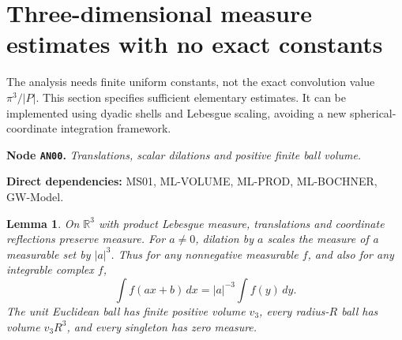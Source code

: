 \documentclass[11pt,a4paper]{article}
\newtheorem{lemma}[theorem]{Lemma}
\theoremstyle{remark}\newtheorem{remark}[theorem]{Remark}
\newcommand{\R}{\mathbb R}\newcommand{\C}{\mathbb C}\newcommand{\N}{\mathbb N}
\newcommand{\abs}[1]{\lvert #1\rvert}\newcommand{\rankone}[2]{\lvert #1\rangle\langle #2\rvert}
\newcommand{\node}[3]{\par\Needspace{6\baselineskip}\smallskip\hypertarget{node:#1}{}\label{nodepage:#1}\noindent\textbf{Node \texttt{#1}.} \textit{#2.}\par\noindent\textbf{Direct dependencies:} #3.\par}
\begin{document}
\section{Three-dimensional measure estimates with no exact constants}\label{sec:integrals}
The analysis needs finite uniform constants, not the exact convolution value $\pi^3/\abs P$. This section specifies sufficient elementary estimates. It can be implemented using dyadic shells and Lebesgue scaling, avoiding a new spherical-coordinate integration framework.

\node{AN00}{Translations, scalar dilations and positive finite ball volume}{MS01, ML-VOLUME, ML-PROD, ML-BOCHNER, GW-Model}
\begin{lemma}\label{lem:affinemeasure}
On $\R^3$ with product Lebesgue measure, translations and coordinate reflections preserve measure. For $a\ne0$, dilation by $a$ scales the measure of a measurable set by $|a|^3$. Thus for any nonnegative measurable $f$, and also for any integrable complex $f$,
\[
 \int f(ax+b)\,dx=|a|^{-3}\int f(y)\,dy.
\]
The unit Euclidean ball has finite positive volume $v_3$, every radius-$R$ ball has volume $v_3R^3$, and every singleton has zero measure.
\end{lemma}
\end{document}

